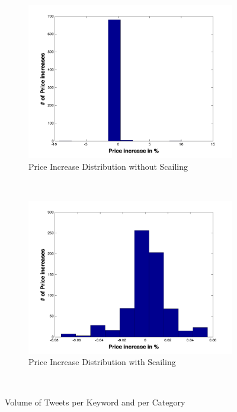 \begin{figure}[ht]
        \centering
        \begin{subfigure}[b]{0.5\textwidth}
                \includegraphics[width=\textwidth]{img/model/p_increase_n}
                \caption{Price Increase Distribution without Scailing}
                \label{fig:u_linear}
        \end{subfigure}%
        ~ %
        \begin{subfigure}[b]{0.5\textwidth}
                \includegraphics[width=\textwidth]{img/model/p_increase_w}
                \caption{Price Increase Distribution with Scailing}
                \label{fig:u_log}
        \end{subfigure}
        ~ %

      
        \caption{Volume of Tweets per Keyword and per Category}\label{fig:distribution}
\end{figure}





